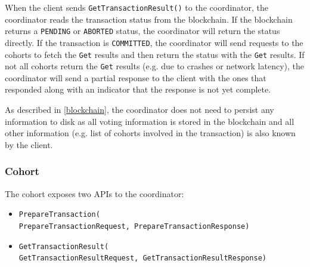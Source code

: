 \documentclass[11pt,conference]{IEEEtran}
\begin{document}
When the client sends \texttt{GetTransactionResult()} to the coordinator, the coordinator reads the transaction status from the blockchain. If the blockchain returns a \texttt{PENDING} or \texttt{ABORTED} status, the coordinator will return the status directly. If the transaction is \texttt{COMMITTED}, the coordinator will send requests to the cohorts to fetch the \texttt{Get} results and then return the status with the \texttt{Get} results. If not all cohorts return the \texttt{Get} results (e.g. due to crashes or network latency), the coordinator will send a partial response to the client with the ones that responded along with an indicator that the response is not yet complete.

As described in \ref{blockchain}, the coordinator does not need to persist any information to disk as all voting information is stored in the blockchain and all other information (e.g. list of cohorts involved in the transaction) is also known by the client.

\subsubsection{Cohort} \label{cohort}
The cohort exposes two APIs to the coordinator:
\begin{itemize}
  \item \texttt{PrepareTransaction(\\PrepareTransactionRequest, PrepareTransactionResponse)}
  \item \texttt{GetTransactionResult(\\GetTransactionResultRequest, GetTransactionResultResponse)}
\end{itemize} 
\end{document}
